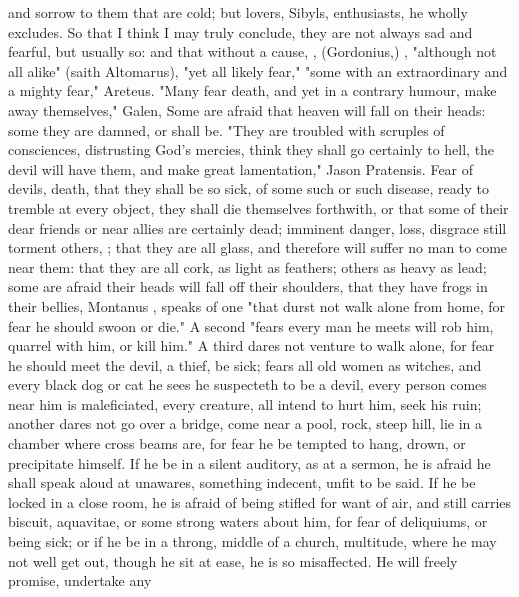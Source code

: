 {and sorrow to them that are cold; but lovers, Sibyls, enthusiasts, he wholly
excludes. So that I think I may truly conclude, they are not always sad and
fearful, but usually so: and that without a cause,
, (Gordonius,) ,
"although not all alike" (saith Altomarus), "yet all
likely fear," "some with an extraordinary and a mighty
fear," Areteus. "Many fear death, and yet in a contrary
humour, make away themselves," Galen,  Some are afraid that heaven will fall on their heads: some
they are damned, or shall be. "They are troubled with
scruples of consciences, distrusting God's mercies, think they shall go
certainly to hell, the devil will have them, and make great lamentation," Jason
Pratensis. Fear of devils, death, that they shall be so sick, of some such or
such disease, ready to tremble at every object, they shall die themselves
forthwith, or that some of their dear friends or near allies are certainly
dead; imminent danger, loss, disgrace still torment others, \etc{}; that they
are all glass, and therefore will suffer no man to come near them: that they
are all cork, as light as feathers; others as heavy as lead; some are afraid
their heads will fall off their shoulders, that they have frogs in their
bellies, \etc{} Montanus , speaks of one "that durst not walk alone from home, for fear he should
swoon or die." A second "fears every man he meets will rob
him, quarrel with him, or kill him." A third dares not venture to walk alone,
for fear he should meet the devil, a thief, be sick; fears all old women as
witches, and every black dog or cat he sees he suspecteth to be a devil, every
person comes near him is maleficiated, every creature, all intend to hurt him,
seek his ruin; another dares not go over a bridge, come near a pool, rock,
steep hill, lie in a chamber where cross beams are, for fear he be tempted to
hang, drown, or precipitate himself. If he be in a silent auditory, as at a
sermon, he is afraid he shall speak aloud at unawares, something indecent,
unfit to be said. If he be locked in a close room, he is afraid of being
stifled for want of air, and still carries biscuit, aquavitae, or some strong
waters about him, for fear of deliquiums, or being sick; or if he be in a
throng, middle of a church, multitude, where he may not well get out, though he
sit at ease, he is so misaffected. He will freely promise, undertake any
}
